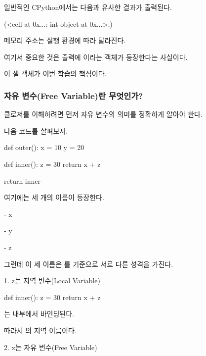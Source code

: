 일반적인 CPython에서는 다음과 유사한 결과가 출력된다.

\begin{dhkzsh}
(<cell at 0x...: int object at 0x...>,)
\end{dhkzsh}

메모리 주소는 실행 환경에 따라 달라진다.

여기서 중요한 것은 출력에 이라는 객체가 등장한다는 사실이다.

이 셀 객체가 이번 학습의 핵심이다.

\subsubsection{자유 변수(Free Variable)란 무엇인가?}

클로저를 이해하려면 먼저 자유 변수의 의미를 정확하게 알아야 한다.

다음 코드를 살펴보자.

\begin{dhkcode}
def outer():
    x = 10
    y = 20

    def inner():
        z = 30
        return x + z

    return inner
\end{dhkcode}

여기에는 세 개의 이름이 등장한다.

\begin{dhksmry}
    - x

    - y

    - z
\end{dhksmry}

그런데 이 세 이름은 를 기준으로 서로 다른 성격을 가진다.

\begin{dhknote}
\begin{dhksmry}[centered]
1. z는 지역 변수(Local Variable)
\end{dhksmry}
\end{dhknote}

\begin{dhkcode}
def inner():
    z = 30
    return x + z
\end{dhkcode}

는  내부에서 바인딩된다.

따라서 의 지역 이름이다.

\begin{dhknote}
\begin{dhksmry}[centered]
2. x는 자유 변수(Free Variable)
\end{dhksmry}
\end{dhknote}

